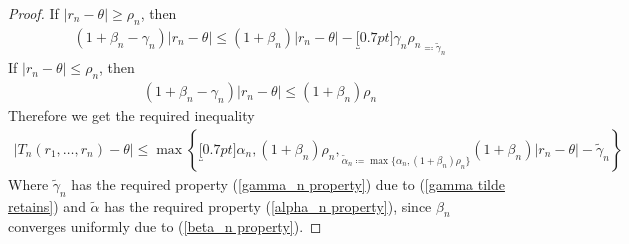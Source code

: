 \begin{proof}
    \noindent If \(|r_n-\theta|\ge\rho_n\), then
    \begin{align}
        (1+\beta_n -\gamma_n)|r_n-\theta| \le  (1+\beta_n)|r_n-\theta| - 
        \underbracket[0.7pt]{\gamma_n \rho_n}_{\eqqcolon \tilde{\gamma}_n}
    \end{align}
    If \(|r_n-\theta|\le\rho_n\), then
    \begin{align}
        (1+\beta_n -\gamma_n)|r_n-\theta|\le (1+\beta_n)\rho_n        
    \end{align}
    Therefore we get the required inequality
    \begin{align*}
        |T_n(r_1,\dots,r_n)-\theta|\le 
        \max\left\{ \underbracket[0.7pt]{\alpha_n, (1+\beta_n)\rho_n,}_{
            \tilde{\alpha}_n \coloneqq \max\{\alpha_n, (1+\beta_n)\rho_n\}
        } 
        (1+\beta_n)|r_n-\theta| - \tilde{\gamma}_n\right\}
    \end{align*}
    Where \(\tilde{\gamma}_n\) has the required property (\ref{gamma_n property}) due to (\ref{gamma tilde retains}) and \(\tilde{\alpha}\) has the required property (\ref{alpha_n property}), since \(\beta_n\) converges uniformly due to (\ref{beta_n property}).
\end{proof}

